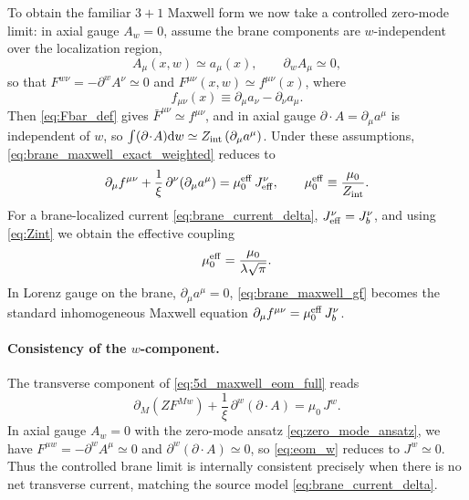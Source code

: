 \documentclass[11pt]{article}
\newcommand{\dd}{\mathrm d}
\newcommand{\A}{A}
\newcommand{\F}{F}
\newcommand{\J}{J}
\newcommand{\Z}{Z}
\newcommand{\lam}{\lambda}      %
\newcommand{\Zint}{Z_{\rm int}} %
\newcommand{\muo}{\mu_0}
\newcommand{\mueff}{\mu_0^{\rm eff}}
\newcommand{\xigf}{\xi}
\begin{document}
To obtain the familiar \(3+1\) Maxwell form we now take a controlled zero-mode
limit: in axial gauge \(\A_w=0\), assume the brane components are \(w\)-independent
over the localization region,
\begin{equation}
  \A_\mu(x,w) \simeq a_\mu(x),
  \qquad
  \partial_w \A_\mu \simeq 0,
  \label{eq:zero_mode_ansatz}
\end{equation}
so that \(\F^{w\nu}=-\partial^w\A^\nu\simeq 0\) and
\(\F^{\mu\nu}(x,w)\simeq f^{\mu\nu}(x)\), where
\begin{equation}
  f_{\mu\nu}(x)\equiv \partial_\mu a_\nu-\partial_\nu a_\mu.
\end{equation}
Then \cref{eq:Fbar_def} gives \(\bar{\F}^{\mu\nu}\simeq f^{\mu\nu}\), and in axial
gauge \(\partial\!\cdot\!\A=\partial_\mu a^\mu\) is independent of \(w\), so
\(\int (\partial\!\cdot\!\A)\dd w \simeq \Zint\,(\partial_\mu a^\mu)\). Under these
assumptions, \cref{eq:brane_maxwell_exact_weighted} reduces to
\begin{equation}
  \partial_\mu f^{\mu\nu}
  + \frac{1}{\xigf}\,\partial^\nu(\partial_\mu a^\mu)
  = \mueff\,\J_{\rm eff}^\nu,
  \qquad
  \mueff \equiv \frac{\muo}{\Zint}.
  \label{eq:brane_maxwell_gf}
\end{equation}
For a brane-localized current \cref{eq:brane_current_delta}, \(\J_{\rm eff}^\nu=\J_b^\nu\),
and using \cref{eq:Zint} we obtain the effective coupling
\begin{equation}
  \mueff = \frac{\muo}{\lam\sqrt{\pi}}.
  \label{eq:mu0_eff}
\end{equation}
In Lorenz gauge on the brane, \(\partial_\mu a^\mu=0\), \cref{eq:brane_maxwell_gf}
becomes the standard inhomogeneous Maxwell equation
\(\partial_\mu f^{\mu\nu}=\mueff\,\J_b^\nu\).

\paragraph{Consistency of the \(w\)-component.}
The transverse component of \cref{eq:5d_maxwell_eom_full} reads
\begin{equation}
  \partial_M\!\left(\Z \F^{Mw}\right)
  + \frac{1}{\xigf}\,\partial^w(\partial\!\cdot\!\A)
  = \muo\,\J^w.
  \label{eq:eom_w}
\end{equation}
In axial gauge \(\A_w=0\) with the zero-mode ansatz \cref{eq:zero_mode_ansatz},
we have \(\F^{\mu w}=-\partial^w\A^\mu\simeq 0\) and \(\partial^w(\partial\!\cdot\!\A)\simeq 0\),
so \cref{eq:eom_w} reduces to \(\J^w\simeq 0\). Thus the controlled brane limit is
internally consistent precisely when there is no net transverse current, matching
the source model \cref{eq:brane_current_delta}.
\end{document}
